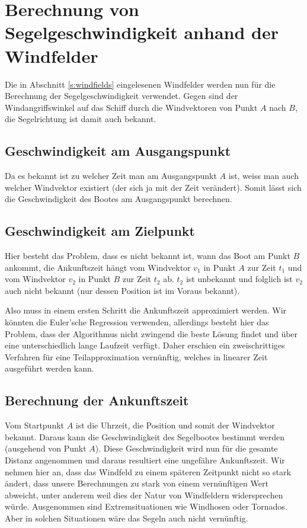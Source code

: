 
\section{Berechnung von Segelgeschwindigkeit anhand der Windfelder}
Die in Abschnitt \ref{s:windfields} eingelesenen Windfelder werden nun für die
Berechnung der Segelgeschwindigkeit verwendet. Gegen sind der
Windangriffswinkel auf das Schiff durch die Windvektoren von Punkt $A$ nach
$B$, die Segelrichtung ist damit auch bekannt.

 
\subsection{Geschwindigkeit am Ausgangspunkt}
Da es bekannt ist zu welcher Zeit man am Ausgangspunkt $A$ ist, weiss man auch
welcher Windvektor existiert (der sich ja mit der Zeit verändert). Somit lässt
sich die Geschwindigkeit des Bootes am Ausgangspunkt berechnen.

\subsection{Geschwindigkeit am Zielpunkt}
Hier besteht das Problem, dass es nicht bekannt ist, wann das Boot am Punkt $B$
ankommt, die Ankunftszeit hängt vom Windvektor $v_{1}$ in Punkt $A$ zur Zeit
$t_{1}$ und vom Windvektor $v_{2}$ in Punkt $B$ zur Zeit $t_{2}$ ab. $t_{2}$
ist unbekannt und folglich ist $v_{2}$ auch nicht bekannt (nur dessen Position
ist im Voraus bekannt).

Also muss in einem ersten Schritt die Ankunftszeit approximiert werden.  Wir
könnten die Euler'sche Regression verwenden, allerdings besteht hier das
Problem, dass der Algorithmus nicht zwingend die beste Lösung findet und über
eine unterschiedlich lange Laufzeit verfügt. Daher erschien ein zweischrittiges
Verfahren für eine Teilapproximation vernünftig, welches in linearer Zeit
ausgeführt werden kann.

\subsection{Berechnung der Ankunftszeit}
Vom Startpunkt $A$ ist die Uhrzeit, die Position und somit der Windvektor
bekannt. Daraus kann die Geschwindigkeit des Segelbootes bestimmt werden
(ausgehend von Punkt $A$). Diese Geschwindigkeit wird nun für die gesamte
Distanz angenommen und daraus resultiert eine ungefähre Ankunftszeit. Wir
nehmen hier an, dass das Windfeld zu einem späteren Zeitpunkt nicht so stark
ändert, dass unsere Berechnungen zu stark von einem vernünftigen Wert
abweicht, unter anderem weil dies der Natur von Windfeldern widersprechen
würde.  Ausgenommen sind Extremsituationen wie Windhosen oder Tornados. Aber
in solchen Situationen wäre das Segeln auch nicht vernünftig.

